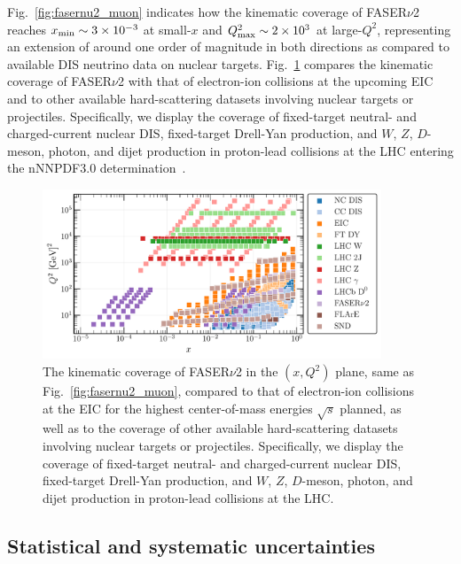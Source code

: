 Fig.~\ref{fig:fasernu2_muon} indicates
how the kinematic coverage of FASER$\nu$2 reaches
$x_{\rm min}\sim 3\times 10^{-3}$ at small-$x$ and $Q^2_{\rm max}\sim 2\times 10^3$
at large-$Q^2$, representing an extension
of around one order of magnitude in both directions as compared to available
DIS neutrino data on nuclear targets.
%
Fig.~\ref{fig:Kin_nNNPDF30_EIC_FPF} compares
the kinematic coverage of FASER$\nu$2 with that of electron-ion collisions
at the upcoming EIC~\cite{Khalek:2021ulf,AbdulKhalek:2021gbh}
and to other available hard-scattering datasets involving
nuclear targets or projectiles.
%
Specifically, we display the coverage of fixed-target neutral- and charged-current nuclear DIS,
fixed-target Drell-Yan production, and $W$, $Z$, $D$-meson, photon, and dijet
production in proton-lead collisions at the LHC entering the  nNNPDF3.0
determination~\cite{AbdulKhalek:2022fyi}.

\begin{figure}[t]
    \centering
    \includegraphics[width = 0.9\textwidth]{plots/Kin_nNNPDF30_EIC_FPF.pdf}
    \caption{The kinematic coverage of FASER$\nu$2 in the $(x,Q^2)$ plane,
      same as  Fig.~\ref{fig:fasernu2_muon},
      compared to that of electron-ion collisions
      at the EIC for the highest center-of-mass energies $\sqrt{s}$ planned,
      as well as to the coverage of other available hard-scattering datasets involving
      nuclear targets or projectiles.
      Specifically, we display the coverage of fixed-target neutral- and charged-current nuclear DIS,
      fixed-target Drell-Yan production, and $W$, $Z$, $D$-meson, photon, and dijet
      production in proton-lead collisions at the LHC.
      }
    \label{fig:Kin_nNNPDF30_EIC_FPF}
\end{figure}

\subsection{Statistical and systematic uncertainties}
\label{subsec:uncertainties}

